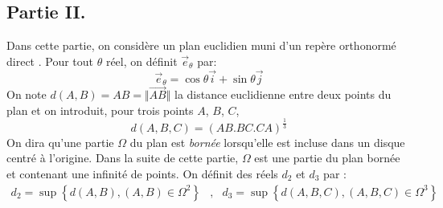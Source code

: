 \subsection*{Partie II.}
Dans cette partie, on considère un plan euclidien muni d'un repère orthonormé direct \repereij. Pour tout $\theta$ réel, on définit $\overrightarrow{e}_\theta$ par:
\begin{displaymath}
 \overrightarrow{e}_\theta = \cos \theta \overrightarrow{i} + \sin \theta \overrightarrow{j}
\end{displaymath}
 On note $d(A,B)=AB=\Vert\overrightarrow{AB}\Vert$ la distance euclidienne entre deux points du plan et on introduit, pour trois points $A$, $B$, $C$, 
\begin{displaymath}
 d(A,B,C)=(AB . BC . CA)^\frac{1}{3} 
\end{displaymath}
On dira qu'une partie $\Omega$ du plan est \emph{bornée} lorsqu'elle est incluse dans un disque centré à l'origine. Dans la suite de cette partie, $\Omega$ est une partie du plan bornée et contenant une infinité de points. On définit des réels $d_2$ et $d_3$ par :
\begin{align*}
 d_2 = \sup \left\lbrace d(A,B), (A,B)\in \Omega^2 \right\rbrace &,&
 d_3 = \sup \left\lbrace d(A,B,C), (A,B,C)\in \Omega^3 \right\rbrace 
\end{align*}

